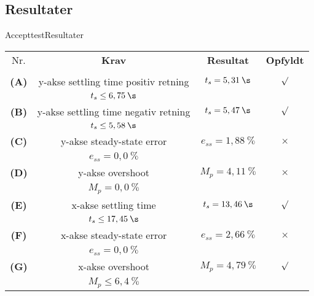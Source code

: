 \subsection{Resultater}
\begin{frame}{Accepttest}{Resultater}

\begin{table}[H]
\centering
\begin{tabular}{|c|c|c|c|} \hline
\rowcolor{lightgray}  Nr.  & \bfseries Krav                   &\bfseries Resultat               &\bfseries Opfyldt\\ 
\rowcolor{lightgray}            &                                         &                               &           \\ \hline
  
\textbf{(A)}                    & y-akse settling time positiv retning & $t_s = 5,31\:\s $             & $\surd$   \\ 
                                & $t_s \leq 6,75 \:\s$                    &                               &           \\ \hline

 \textbf{(B)}                    & y-akse settling time negativ retning & $t_s = 5,47\:\s $             & $\surd$   \\ 
                                 & $t_s \leq 5,58\: \s$                    &                               &           \\ \hline
\textbf{(C)}                    & y-akse steady-state error               & $e_{ss} = 1,88\:\%$           & $\times$  \\ 
                                 & $e_{ss} = 0,0\:\%$                      &                               &           \\ \hline
 \textbf{(D)}                    & y-akse overshoot                        & $M_p =  4,11\:\% $            & $\times$  \\ 
                                 & $M_p = 0,0\:\%$                         &                               &           \\ \hline
 \textbf{(E)}                    & x-akse settling time                    & $t_s = 13,46\:\s$             & $\surd$   \\ 
                                 & $t_s \leq 17,45\: \s$                   &                               &           \\ \hline
 \textbf{(F)}                    & x-akse steady-state error               & $e_{ss} \!=\! 2,\!66\:\%$     & $\times$  \\ 
                                 & $e_{ss} = 0,0\:\%$                      &                               &           \\ \hline
 \textbf{(G)}                    & x-akse overshoot                        & $M_p = 4,79\:\% $             & $\surd$   \\
                                 & $M_p \leq 6,4\:\%$                      &                               &           \\ \hline
\end{tabular}
\end{table}
\end{frame}









